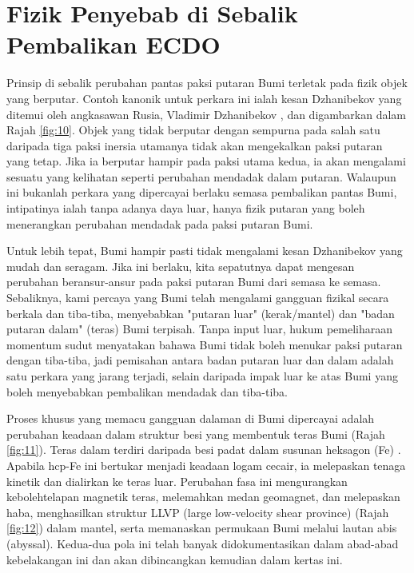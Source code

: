 \documentclass[10pt,twocolumn,letterpaper]{article}
\begin{document}
\section{Fizik Penyebab di Sebalik Pembalikan ECDO}

Prinsip di sebalik perubahan pantas paksi putaran Bumi terletak pada fizik objek yang berputar. Contoh kanonik untuk perkara ini ialah kesan Dzhanibekov yang ditemui oleh angkasawan Rusia, Vladimir Dzhanibekov \cite{37}, dan digambarkan dalam Rajah \ref{fig:10}. Objek yang tidak berputar dengan sempurna pada salah satu daripada tiga paksi inersia utamanya tidak akan mengekalkan paksi putaran yang tetap. Jika ia berputar hampir pada paksi utama kedua, ia akan mengalami sesuatu yang kelihatan seperti perubahan mendadak dalam putaran. Walaupun ini bukanlah perkara yang dipercayai berlaku semasa pembalikan pantas Bumi, intipatinya ialah tanpa adanya daya luar, hanya fizik putaran yang boleh menerangkan perubahan mendadak pada paksi putaran Bumi.

Untuk lebih tepat, Bumi hampir pasti tidak mengalami kesan Dzhanibekov yang mudah dan seragam. Jika ini berlaku, kita sepatutnya dapat mengesan perubahan beransur-ansur pada paksi putaran Bumi dari semasa ke semasa. Sebaliknya, kami percaya yang Bumi telah mengalami gangguan fizikal secara berkala dan tiba-tiba, menyebabkan "putaran luar" (kerak/mantel) dan "badan putaran dalam" (teras) Bumi terpisah. Tanpa input luar, hukum pemeliharaan momentum sudut menyatakan bahawa Bumi tidak boleh menukar paksi putaran dengan tiba-tiba, jadi pemisahan antara badan putaran luar dan dalam adalah satu perkara yang jarang terjadi, selain daripada impak luar ke atas Bumi yang boleh menyebabkan pembalikan mendadak dan tiba-tiba.

Proses khusus yang memacu gangguan dalaman di Bumi dipercayai adalah perubahan keadaan dalam struktur besi yang membentuk teras Bumi (Rajah \ref{fig:11}). Teras dalam terdiri daripada besi padat dalam susunan heksagon (Fe) \cite{141}. Apabila hcp-Fe ini bertukar menjadi keadaan logam cecair, ia melepaskan tenaga kinetik dan dialirkan ke teras luar. Perubahan fasa ini mengurangkan kebolehtelapan magnetik teras, melemahkan medan geomagnet, dan melepaskan haba, menghasilkan struktur LLVP (large low-velocity shear province) (Rajah \ref{fig:12}) \cite{38} dalam mantel, serta memanaskan permukaan Bumi melalui lautan abis (abyssal). Kedua-dua pola ini telah banyak didokumentasikan dalam abad-abad kebelakangan ini dan akan dibincangkan kemudian dalam kertas ini.
\end{document}
